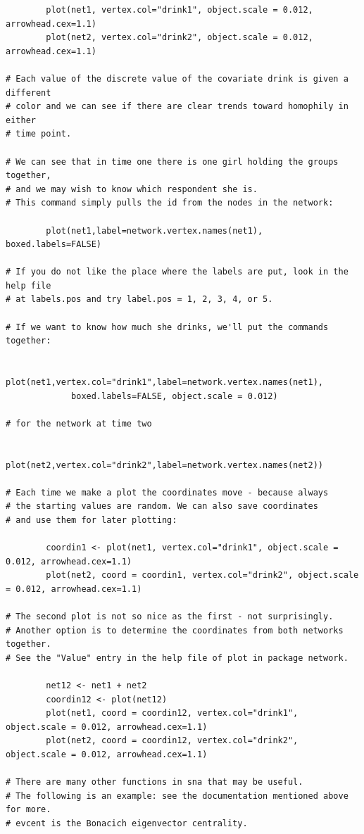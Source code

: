 \documentclass[a4paper,fleqn]{article}
\newcommand{\+}{\, + \,}
\begin{document}
{\begin{verbatim}
        plot(net1, vertex.col="drink1", object.scale = 0.012, arrowhead.cex=1.1)
        plot(net2, vertex.col="drink2", object.scale = 0.012, arrowhead.cex=1.1)

# Each value of the discrete value of the covariate drink is given a different
# color and we can see if there are clear trends toward homophily in either
# time point.

# We can see that in time one there is one girl holding the groups together,
# and we may wish to know which respondent she is.
# This command simply pulls the id from the nodes in the network:

        plot(net1,label=network.vertex.names(net1), boxed.labels=FALSE)

# If you do not like the place where the labels are put, look in the help file
# at labels.pos and try label.pos = 1, 2, 3, 4, or 5.

# If we want to know how much she drinks, we'll put the commands together:

        plot(net1,vertex.col="drink1",label=network.vertex.names(net1),
             boxed.labels=FALSE, object.scale = 0.012)

# for the network at time two

        plot(net2,vertex.col="drink2",label=network.vertex.names(net2))

# Each time we make a plot the coordinates move - because always
# the starting values are random. We can also save coordinates
# and use them for later plotting:

        coordin1 <- plot(net1, vertex.col="drink1", object.scale = 0.012, arrowhead.cex=1.1)
        plot(net2, coord = coordin1, vertex.col="drink2", object.scale = 0.012, arrowhead.cex=1.1)

# The second plot is not so nice as the first - not surprisingly.
# Another option is to determine the coordinates from both networks together.
# See the "Value" entry in the help file of plot in package network.

        net12 <- net1 + net2
        coordin12 <- plot(net12)
        plot(net1, coord = coordin12, vertex.col="drink1", object.scale = 0.012, arrowhead.cex=1.1)
        plot(net2, coord = coordin12, vertex.col="drink2", object.scale = 0.012, arrowhead.cex=1.1)

# There are many other functions in sna that may be useful.
# The following is an example: see the documentation mentioned above for more.
# evcent is the Bonacich eigenvector centrality.


\end{verbatim}}
\end{document}

